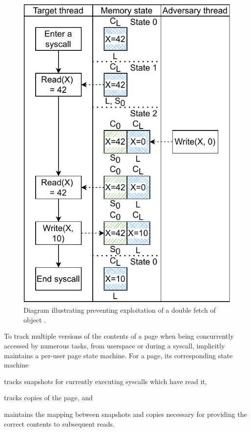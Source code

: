 \documentclass[letterpaper,twocolumn,10pt]{article}
\begin{document}
\begin{figure}[h]
  \centering
  \includegraphics[width=0.85\linewidth]{img/doublefetch_midas.pdf}
  \caption{Diagram illustrating \midas preventing exploitation of a 
  double fetch of object .}
  \label{fig:doublefetch_midas}
\end{figure}

To track multiple versions of the contents of a page when being concurrently 
accessed by numerous tasks, from userspace or during a syscall,
\midas implicitly maintains a per-user page state machine.
For a page, its corresponding state machine 
\begin{inparaenum}
  \item tracks snapshots for currently executing syscalls which have read it, 
  \item tracks copies of the page, and 
  \item maintains the mapping between snapshots and copies necessary for providing 
  the correct contents to subsequent reads. %
\end{inparaenum}
\end{document}
